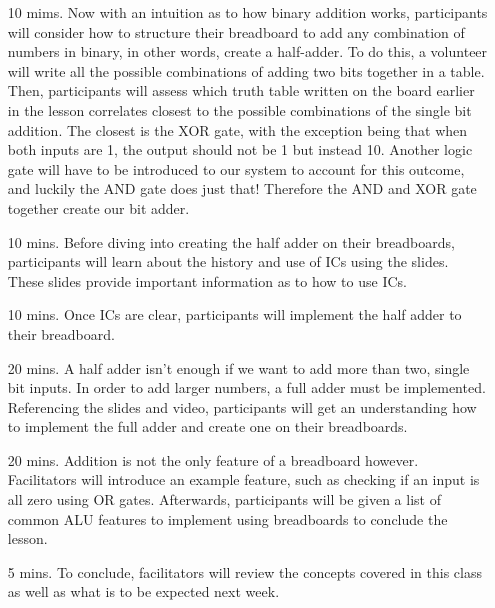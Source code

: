 \documentclass[11pt]{article}
\begin{document}
\begin{itemize}
\item[10 mims.] Now with an intuition as to how binary addition works,
  participants will consider how to structure their breadboard to add any
  combination of numbers in binary, in other words, create a half-adder. To do
  this, a volunteer will write all the possible combinations of adding two bits
  together in a table. Then, participants will assess which truth table written
  on the board earlier in the lesson correlates closest to the possible
  combinations of the single bit addition. The closest is the XOR gate, with the
  exception being that when both inputs are 1, the output should not be 1 but
  instead 10. Another logic gate will have to be introduced to our system to
  account for this outcome, and luckily the AND gate does just that! Therefore
  the AND and XOR gate together create our bit adder.
\item[10 mins.] Before diving into creating the half adder on their breadboards,
  participants will learn about the history and use of ICs using the
  slides. These slides provide important information as to how to use ICs.
\item[10 mins.] Once ICs are clear, participants will implement the half adder
  to their breadboard.
\item[20 mins.] A half adder isn't enough if we want to add more than two,
  single bit inputs. In order to add larger numbers, a full adder must be
  implemented. Referencing the slides and video, participants will get an
  understanding how to implement the full adder and create one on their
  breadboards.
\item[20 mins.] Addition is not the only feature of a breadboard
  however. Facilitators will introduce an example feature, such as checking if
  an input is all zero using OR gates. Afterwards, participants will be given a
  list of common ALU features to implement using breadboards to conclude the
  lesson.
\item[5 mins.] To conclude, facilitators will review the concepts covered in
  this class as well as what is to be expected next week.
\end{itemize}
\end{document}
